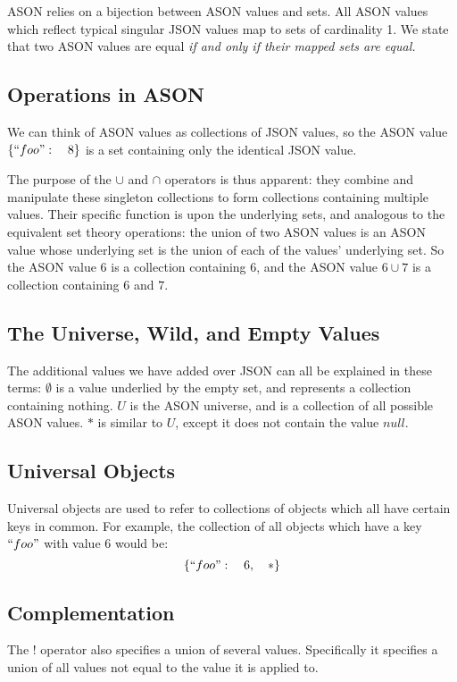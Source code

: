 \documentclass[letterpaper]{article}
\begin{document}
ASON relies on a bijection between ASON values and sets. All ASON values which
reflect typical singular JSON values map to sets of cardinality 1. We state
that two ASON values are equal \em if and only if \em their mapped sets are
equal.

\subsection{Operations in ASON}
We can think of ASON values as collections of JSON values, so the ASON value
\(\{``foo":\quad8\}\) is a set containing only the identical JSON value.

The purpose of the \(\cup\) and \(\cap\) operators is thus apparent: they
combine and manipulate these singleton collections to form collections
containing multiple values. Their specific function is upon the underlying
sets, and analogous to the equivalent set theory operations: the union of two
ASON values is an ASON value whose underlying set is the union of each of the
values' underlying set. So the ASON value \(6\) is a collection containing
\(6\), and the ASON value \(6\cup7\) is a collection containing \(6\) and
\(7\).

\subsection{The Universe, Wild, and Empty Values}
The additional values we have added over JSON can all be explained in these
terms: \(\emptyset\) is a value underlied by the empty set, and represents a
collection containing nothing. \(U\) is the ASON universe, and is a collection
of all possible ASON values. \(*\) is similar to \(U\), except it does not
contain the value \(null\).

\begin{samepage}
\subsection{Universal Objects}
Universal objects are used to refer to collections of objects which all have
certain keys in common. For example, the collection of all objects which have a
key \(``foo"\) with value \(6\) would be:
%
\begin{equation}
\{``foo":\quad6,\quad *\}
\end{equation}
\end{samepage}

\subsection{Complementation}
The \(!\) operator also specifies a union of several values. Specifically it
specifies a union of all values not equal to the value it is applied to.
\end{document}
